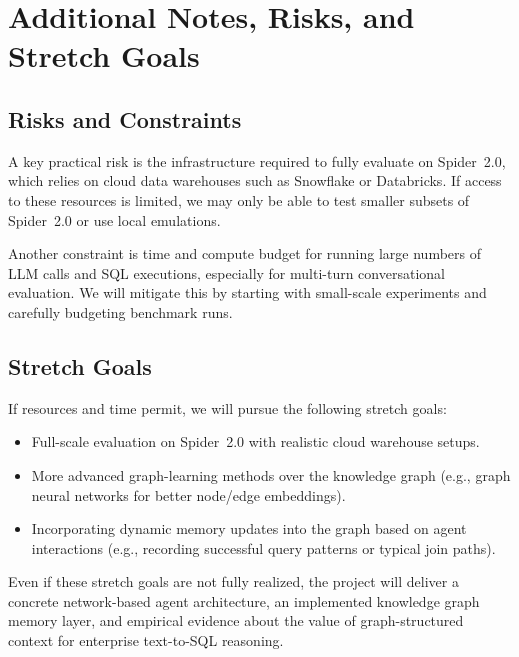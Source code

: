 \documentclass[11pt]{article}
\begin{document}
\section{Additional Notes, Risks, and Stretch Goals}

\subsection{Risks and Constraints}

A key practical risk is the infrastructure required to fully evaluate on Spider~2.0, which relies on cloud data warehouses such as Snowflake or Databricks.
If access to these resources is limited, we may only be able to test smaller subsets of Spider~2.0 or use local emulations.

Another constraint is time and compute budget for running large numbers of LLM calls and SQL executions, especially for multi-turn conversational evaluation.
We will mitigate this by starting with small-scale experiments and carefully budgeting benchmark runs.

\subsection{Stretch Goals}

If resources and time permit, we will pursue the following stretch goals:

\begin{itemize}[leftmargin=*]
  \item Full-scale evaluation on Spider~2.0 with realistic cloud warehouse setups.
  \item More advanced graph-learning methods over the knowledge graph (e.g., graph neural networks for better node/edge embeddings).
  \item Incorporating dynamic memory updates into the graph based on agent interactions (e.g., recording successful query patterns or typical join paths).
\end{itemize}

Even if these stretch goals are not fully realized, the project will deliver a concrete network-based agent architecture, an implemented knowledge graph memory layer, and empirical evidence about the value of graph-structured context for enterprise text-to-SQL reasoning.
\end{document}
